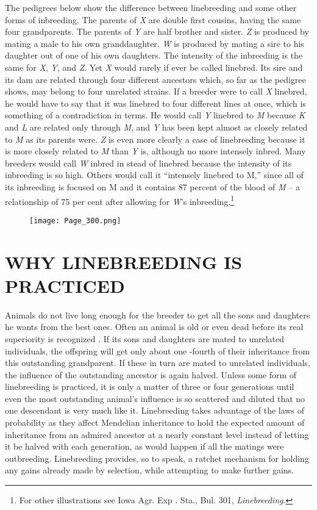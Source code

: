 The pedigrees below show the difference between linebreeding and
some other forms of inbreeding. The parents of \textit{X} are double first
cousins, having the same four grandparents. The parents of \textit{Y} are half
brother and sister. \textit{Z} is produced by mating a male to his own granddaughter.
\textit{W} is produced by mating a sire to his daughter out of one of
his own daughters. The intensity of the inbreeding is the same for \textit{X}, \textit{Y},
and \textit{Z}. Yet \textit{X} would rarely if ever be called linebred. Its sire and its dam
are related through four different ancestors which, so far as the pedigree
shows, may belong to four unrelated strains. If a breeder were to
call \textit{X} linebred, he would have to say that it was linebred to four different
lines at once, which is something of a contradiction in terms. He
would call \textit{Y} linebred to \textit{M} because \textit{K} and \textit{L} are related only through
\textit{M}, and \textit{Y} has been kept almost as closely related to \textit{M} as its parents
were. \textit{Z} is even more clearly a case of linebreeding because it is more
closely related to \textit{M} than \textit{Y} is, although no more intensely inbred. Many
breeders would call \textit{W} inbred in stead of linebred because the intensity
of its inbreeding is so high. Others would call it ``intensely linebred to
M,'' since all of its inbreeding is focused on M and it contains 87
percent of the blood of \textit{M} -- a relationship of 75 per cent after allowing for
\textit{W}'s inbreeding.\footnote{For other illustrations see Iowa Agr. Exp . Sta.,
Bul. 301, \textit{Linebreeding}.}

\begin{figure}
	\centering
    \texttt{[image: Page\_300.png]}
    \label{fig:Lush_Figure_Page_300}
\end{figure}

\section*{WHY LINEBREEDING IS PRACTICED}

Animals do not live long enough for the breeder to get all the sons
and daughters he wants from the best ones. Often an animal is old or
even dead before its real superiority is recognized . If its sons and
daughters are mated to unrelated individuals, the offspring will get
only about one -fourth of their inheritance from this outstanding grandparent.
If these in turn are mated to unrelated individuals, the influence
of the outstanding ancestor is again halved. Unless some form of
linebreeding is practiced, it is only a matter of three or four generations
until even the most outstanding animal's influence is so scattered and
diluted that no one descendant is very much like it. Linebreeding takes
advantage of the laws of probability as they affect Mendelian inheritance
to hold the expected amount of inheritance from an admired
ancestor at a nearly constant level instead of letting it be halved with
each generation, as would happen if all the matings were outbreeding.
Linebreeding provides, so to speak, a ratchet mechanism for holding
any gains already made by selection, while attempting to make further
gains.

